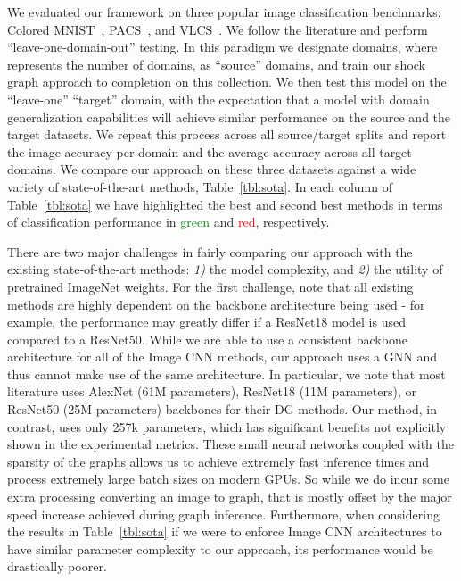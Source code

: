 We evaluated our framework on three popular image classification benchmarks: Colored MNIST~\cite{Arjovsky:etal:ARXIV20, Gulrajani:etal:ARXIV20}, PACS~\cite{Li:etal:ICCV17}, and VLCS~\cite{Fang:etal:ICCV13}. We follow the literature and perform ``leave-one-domain-out'' testing. In this paradigm we designate  domains, where  represents the number of domains, as ``source'' domains, and train our shock graph approach to completion on this collection. We then test this model on the ``leave-one'' ``target'' domain, with the expectation that a model with domain generalization capabilities will achieve similar performance on the source and the target datasets. We repeat this process across all source/target splits and report the image accuracy per domain and the average accuracy across all  target domains. We compare our approach on these three datasets against a wide variety of state-of-the-art methods, Table~\ref{tbl:sota}. In each column of Table~\ref{tbl:sota} we have highlighted the best and second best methods in terms of classification performance in \textcolor{green}{green} and \textcolor{red}{red}, respectively. 


There are two major challenges in fairly comparing our approach with the existing state-of-the-art methods: \emph{1)} the model complexity, and \emph{2)} the utility of pretrained ImageNet weights. For the first challenge, note that all existing methods are highly dependent on the backbone architecture being used - for example, the performance may greatly differ if a ResNet18 model is used compared to a ResNet50. While we are able to use a consistent backbone architecture for all of the Image CNN methods, our approach uses a GNN and thus cannot make use of the same architecture.  In particular, we note that most literature uses AlexNet (61M parameters), ResNet18 (11M parameters), or ResNet50 (25M parameters) backbones for their DG methods. Our method, in contrast, uses only 257k parameters, which has significant benefits not explicitly shown in the experimental metrics. These small neural networks coupled with the sparsity of the graphs allows us to achieve extremely fast inference times and process extremely large batch sizes on modern GPUs. So while we do incur some extra processing converting an image to graph, that is mostly offset by the major speed increase achieved during graph inference. Furthermore, when considering the results in Table~\ref{tbl:sota} if we were to enforce Image CNN architectures to have similar parameter complexity to our approach, its performance would be drastically poorer. 

